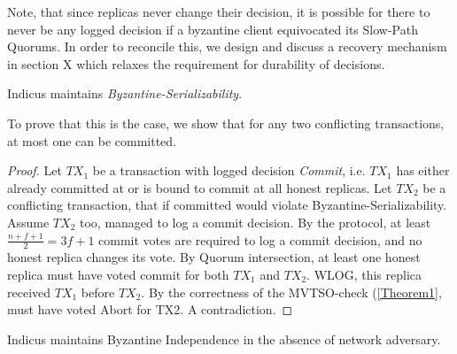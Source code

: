 Note, that since replicas never change their decision, it is possible for there to never be any logged decision if a byzantine client equivocated its Slow-Path Quorums. In order to reconcile this, we design and discuss a recovery mechanism in section X which relaxes the requirement for durability of decisions.  


\begin{theorem} 
Indicus maintains \textit{Byzantine-Serializability}.
\end{theorem}
To prove that this is the case, we show that for any two conflicting transactions, at most one can be committed.
\begin{proof}

Let $TX_1$ be a transaction with logged decision \textit{Commit}, i.e. $TX_1$ has either already committed at or is bound to commit at all honest replicas. Let $TX_2$ be a conflicting transaction, that if committed would violate Byzantine-Serializability. Assume $TX_2$ too, managed to log a commit decision. By the protocol, at least  $\frac{n+f+1}{2} = 3f+1$ commit votes are required to log a commit decision, and no honest replica changes its vote. By Quorum intersection, at least one honest replica must have voted commit for both $TX_1$ and $TX_2$. WLOG, this replica received $TX_1$ before $TX_2$. By the correctness of the MVTSO-check (\ref{Theorem1}, must have voted Abort for TX2. A contradiction.


\end{proof}

\begin{theorem} 
Indicus maintains Byzantine Independence in the absence of network adversary.
\end{theorem}

